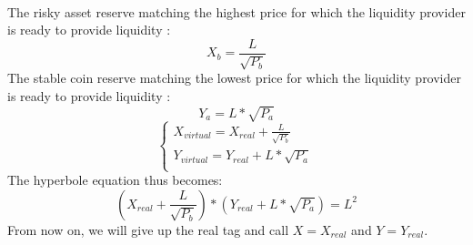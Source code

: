 \documentclass[conference]{IEEEtran}
\begin{document}
\\
The risky asset reserve matching the highest price for which the liquidity provider is ready to provide liquidity :
\begin{equation}
    X_b = \frac{L}{\sqrt{P_b}}
\end{equation}
The stable coin reserve matching the lowest price for which the liquidity provider is ready to provide liquidity :
\begin{equation}
    Y_a = L *\sqrt{P_a}
\end{equation}
\begin{equation}
\left\{
\begin{array}{ll}
  X_{virtual} = X_{real}+\frac{L}{\sqrt{P_b}}\\
  Y_{virtual} = Y_{real} + L *\sqrt{P_a}\\
\end{array}
\right.
\end{equation}
The hyperbole equation thus becomes:
\begin{equation}
    (X_{real}+\frac{L}{\sqrt{P_b}})* (Y_{real} + L *\sqrt{P_a})= L^2
\end{equation}
From now on, we will give up the real tag and call $X=X_{real}$ and $Y=Y_{real}$.
\end{document}

